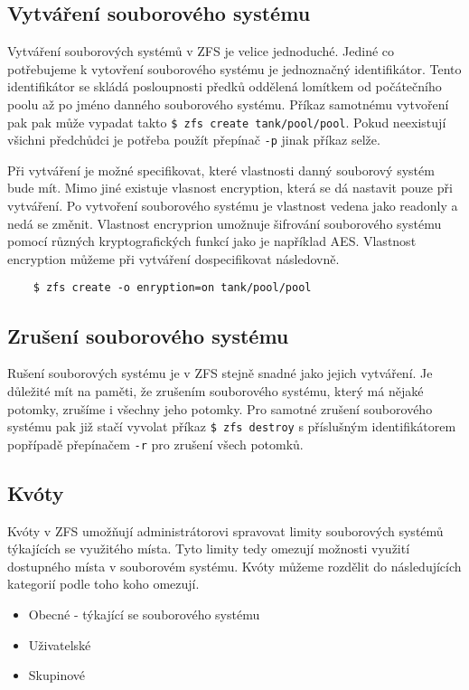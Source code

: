     \subsection{Vytváření souborového systému}
    \label{createfs}
    Vytváření souborových systémů v ZFS je velice jednoduché. Jediné co potřebujeme k vytovření souborového systému je jednoznačný identifikátor. Tento identifikátor se skládá posloupnosti předků oddělená lomítkem od počátečního poolu až po jméno danného souborového systému. Příkaz samotnému vytvoření pak pak může vypadat takto \verb|$ zfs create tank/pool/pool|. Pokud neexistují všichni předchůdci je potřeba použít přepínač \verb|-p| jinak příkaz selže.

    Při vytváření je možné specifikovat, které vlastnosti danný souborový systém bude mít. Mimo jiné existuje vlasnost encryption, která se dá nastavit pouze při vytváření. Po vytvoření souborového systému je vlastnost vedena jako readonly a nedá se změnit. Vlastnost encryprion umožnuje šifrování souborového systému pomocí různých kryptografických funkcí jako je například AES. Vlastnost encryption můžeme při vytváření dospecifikovat následovně.
    \begin{verbatim}
    $ zfs create -o enryption=on tank/pool/pool
    \end{verbatim}
    \subsection{Zrušení souborového systému}
    Rušení souborových systému je v ZFS stejně snadné jako jejich vytváření. Je důležité mít na paměti, že zrušením souborového systému, který má nějaké potomky, zrušíme i všechny jeho potomky. Pro samotné zrušení souborového systému pak již stačí vyvolat příkaz \verb|$ zfs destroy| s příslušným identifikátorem popřípadě přepínačem \verb|-r| pro zrušení všech potomků.
    \subsection{Kvóty}
    \label{quota}
    Kvóty v ZFS umožňují administrátorovi spravovat limity souborových systémů týkajících se využitého místa. Tyto limity tedy omezují možnosti využití dostupného místa v souborovém systému. Kvóty můžeme rozdělit do následujících kategorií podle toho koho omezují.
    \begin{itemize}
      \item Obecné - týkající se souborového systému
      \item Uživatelské
      \item Skupinové
    \end{itemize}

